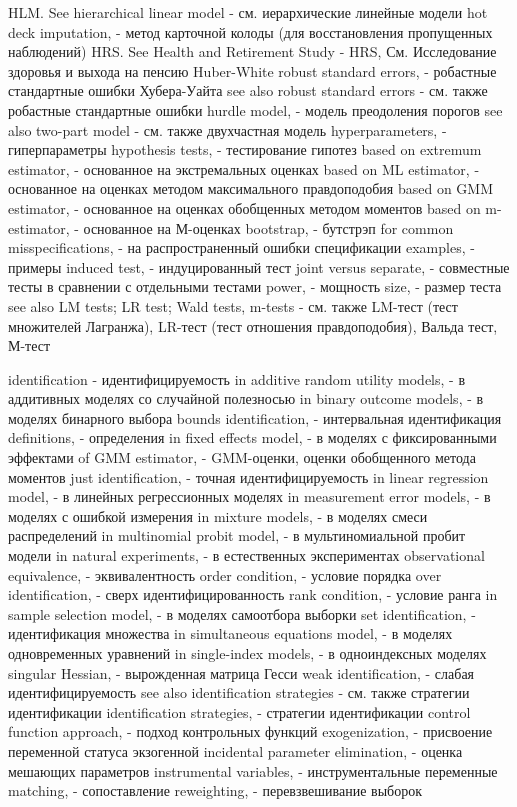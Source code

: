 HLM. See hierarchical linear model - см. иерархические линейные модели
hot deck imputation, - метод карточной колоды (для восстановления пропущенных наблюдений)
HRS. See Health and Retirement Study - HRS, См. Исследование здоровья и выхода на пенсию
Huber-White robust standard errors, - робастные стандартные ошибки Хубера-Уайта
see also robust standard errors - см. также робастные стандартные ошибки
hurdle model, - модель преодоления порогов
see also two-part model - см. также двухчастная модель
hyperparameters, - гиперпараметры
hypothesis tests, - тестирование гипотез
based on extremum estimator, - основанное на экстремальных оценках
based on ML estimator, - основанное на оценках методом максимального правдоподобия
based on GMM estimator, - основанное на оценках обобщенных методом моментов
based on m-estimator, - основанное на М-оценках
bootstrap, - бутстрэп
for common misspecifications, - на распространенный ошибки спецификации
examples, - примеры
induced test, - индуцированный тест
joint versus separate, - совместные тесты в сравнении с отдельными тестами
power, - мощность
size, - размер теста
see also LM tests; LR test; Wald tests, m-tests - см. также LM-тест (тест множителей Лагранжа), LR-тест (тест отношения правдоподобия), Вальда тест, М-тест

identification - идентифицируемость
in additive random utility models, - в аддитивных моделях со случайной полезносью
in binary outcome models, - в моделях бинарного выбора
bounds identification, - интервальная идентификация
definitions, - определения
in fixed effects model, - в моделях с фиксированными эффектами
of GMM estimator, - GMM-оценки, оценки обобщенного метода моментов
just identification, - точная идентифицируемость
in linear regression model, - в линейных регрессионных моделях
in measurement error models, - в моделях с ошибкой измерения
in mixture models, - в моделях смеси распределений
in multinomial probit model, - в мультиномиальной пробит модели
in natural experiments, - в естественных экспериментах
observational equivalence, - эквивалентность
order condition, - условие порядка
over identification, - сверх идентифицированность
rank condition, - условие ранга
in sample selection model, - в моделях самоотбора выборки
set identification, - идентификация множества
in simultaneous equations model, - в моделях одновременных уравнений
in single-index models, - в одноиндексных моделях
singular Hessian, - вырожденная матрица Гесси
weak identification, - слабая идентифицируемость
see also identification strategies - см. также стратегии идентификации
identification strategies, - стратегии идентификации
control function approach, - подход контрольных функций
exogenization, - присвоение переменной статуса экзогенной
incidental parameter elimination, - оценка мешающих параметров
instrumental variables, - инструментальные переменные
matching, - сопоставление
reweighting, - перевзвешивание выборок 

